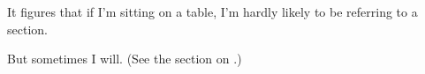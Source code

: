 \documentclass{article}
\begin{document}
It figures that if I'm sitting on a table, I'm hardly likely to be referring to a section. 

But sometimes I will. (See the section on .)
\end{document}
